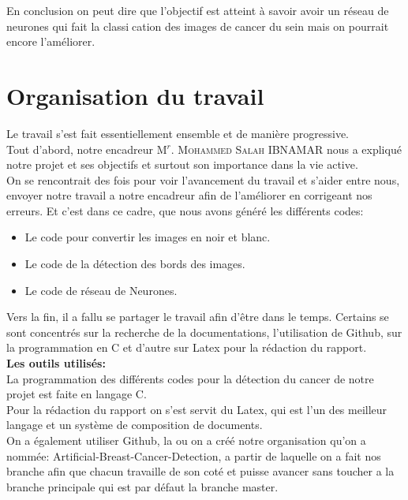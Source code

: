 \documentclass[a4paper,11pt]{report}
\begin{document}
En conclusion on peut dire que l'objectif est atteint à savoir avoir un réseau
de neurones qui fait la classication des images de cancer du sein mais on
pourrait encore l'améliorer.



\chapter*{Organisation du travail}
Le travail s’est fait essentiellement ensemble et de manière progressive.\\

Tout d’abord, notre encadreur M$^{r}$. \textsc{Mohammed Salah} IBNAMAR  nous a expliqué notre projet et ses objectifs et surtout son importance dans la vie active.\\

On se rencontrait des fois pour voir l'avancement  du travail et s'aider entre nous, envoyer notre travail a notre encadreur afin de l'améliorer en corrigeant nos erreurs. Et c'est dans ce cadre, que nous avons généré les différents codes:\\
\begin{itemize}
      \item [\star] Le code pour convertir les images en noir et blanc.
      \item [\star] Le code de la détection des bords des images.
      \item [\star] Le code de réseau de Neurones.\\
    \end{itemize}
    
Vers la fin, il a fallu se partager le travail afin d’être dans le temps. Certains se sont concentrés sur la recherche de la documentations, l'utilisation de Github, sur la programmation en C et d’autre sur Latex pour la rédaction du rapport.\\

\textbf{Les outils utilisés:}\\

La programmation des différents codes pour la détection du cancer de notre projet est faite en langage C.\\

Pour la rédaction du rapport on s'est servit du Latex, qui est l'un des meilleur langage et un système de composition de documents.\\

On a également utiliser Github, la ou on a créé notre organisation qu'on a nommée: Artificial-Breast-Cancer-Detection, a partir de laquelle on a fait nos branche afin que chacun travaille de son coté et puisse avancer sans toucher a la branche principale qui est par défaut la branche master. \\
\end{document}
